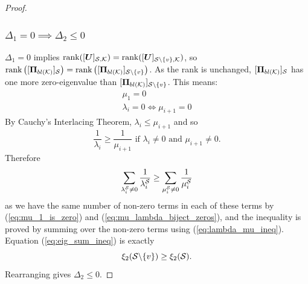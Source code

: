 \begin{proof}
    \subsubsection{\texorpdfstring{$\Delta_{1}= 0 \implies \Delta_{2} \leq 0$}{\textDelta\textoneinferior = 0 implies \textDelta\texttwoinferior =< 0}}
    $\Delta_{1} = 0$ implies  $\textrm{rank}([\bm{U}]_{\mathcal{S},\mathcal{K}}) = \textrm{rank}([\bm{U}]_{\mathcal{S} \backslash\{v\}, \mathcal{K}})$,  so  $\rank{\projbl[S]} = \rank{\projblgen[\set{S} \backslash \{v\}]}$. As the rank is unchanged, $[\bm{\Pi}_{bl(\mathcal{K})}]_{\mathcal{S}}$ has one more zero-eigenvalue than 
 $[\bm{\Pi}_{bl(\mathcal{K})}]_{\mathcal{S} \backslash \{v\}}$. This means:
    \begin{align}
        \mu_{1} = 0 \label{eq:mu_1_is_zero}\\
        \lambda_{i} = 0 \iff \mu_{i+1} = 0 \label{eq:mu_lambda_biject_zeros}
    \end{align} 
    By Cauchy's Interlacing Theorem, $\lambda_{i} \leq \mu_{i+1}$ and so 
    \begin{equation}
        \frac{1}{\lambda_{i}} \geq \frac{1}{\mu_{i+1}} \text{ if } \lambda_{i} \neq 0 \text{ and } \mu_{i+1} \neq 0.  \label{eq:lambda_mu_ineq}
    \end{equation} Therefore
 \begin{equation}
     \sum_{\lambda_{i}^{\mathcal{S}} \neq 0} { \frac{1}{\lambda_{i}^{\mathcal{S}}}} \geq \sum_{\mu_{i}^{\mathcal{S}} \neq 0} { \frac{1}{\mu_{i}^{\mathcal{S}}}} \label{eq:eig_sum_ineq}
 \end{equation}
 as we have the same number of non-zero terms in each of these terms by (\ref{eq:mu_1_is_zero}) and (\ref{eq:mu_lambda_biject_zeros}), and the inequality is proved by summing over the non-zero terms using (\ref{eq:lambda_mu_ineq}).
Equation (\ref{eq:eig_sum_ineq}) is exactly 
\begin{equation}
   \xi_{2}(\mathcal{S} \backslash \{v\}) \geq \xi_{2}(\mathcal{S}).
\end{equation}
Rearranging gives $\Delta_{2} \leq 0$.


\end{proof}
